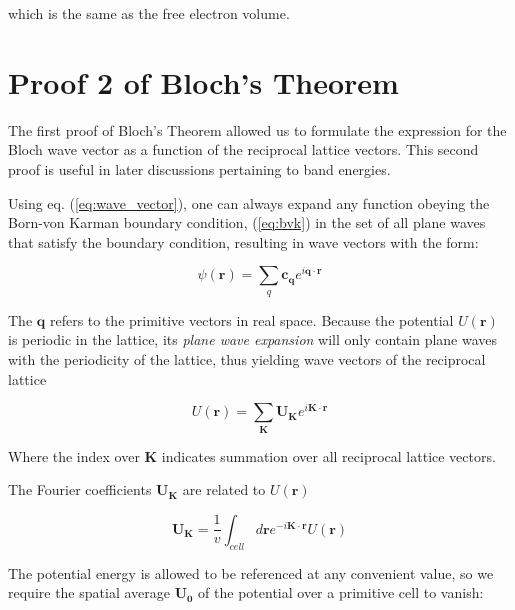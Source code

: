 	which is the same as the free electron volume.

\section{Proof 2 of Bloch's Theorem}
	The first proof of Bloch's Theorem allowed us to formulate the expression for the Bloch wave vector as a function of the reciprocal lattice vectors.  This second proof is useful in later discussions pertaining to band energies.

	Using eq. (\ref{eq:wave_vector}), one can always expand any function obeying the Born-von Karman boundary condition, (\ref{eq:bvk}) in the set of all plane waves that satisfy the boundary condition, resulting in wave vectors with the form:

	\begin{equation} \label{eq:waves_q}
		\psi(\mathbf{r})
		=
		\sum_{q}
		\mathbf{c_q}
		e^{i\mathbf{q} \cdot \mathbf{r}}
	\end{equation}

	The $\mathbf{q}$ refers to the primitive vectors in real space.  Because the potential $U(\mathbf{r})$ is periodic in the lattice, its \emph{plane wave expansion} will only contain plane waves with the periodicity of the lattice, thus yielding wave vectors of the reciprocal lattice

	\begin{equation} \label{eq:U(r)}
		U(\mathbf{r})
		=
		\sum_{\mathbf{K}}
		\mathbf{U_K}
		e^{i \mathbf{K} \cdot \mathbf{r}}
	\end{equation}

	Where the index over $\mathbf{K}$ indicates summation over all reciprocal lattice vectors.

	The Fourier coefficients $\mathbf{U_K}$ are related to $U(\mathbf{r})$ 

	\begin{equation} \label{eq:U_k}
		\mathbf{U_K}
		=
		\frac{1}{v}
		\int_{cell}
		d \mathbf{r}
		e^{-i \mathbf{K} \cdot \mathbf{r}}
		U(\mathbf{r})
	\end{equation}

	The potential energy is allowed to be referenced at any convenient value, so we require the spatial average $\mathbf{U_0}$ of the potential over a primitive cell to vanish:

